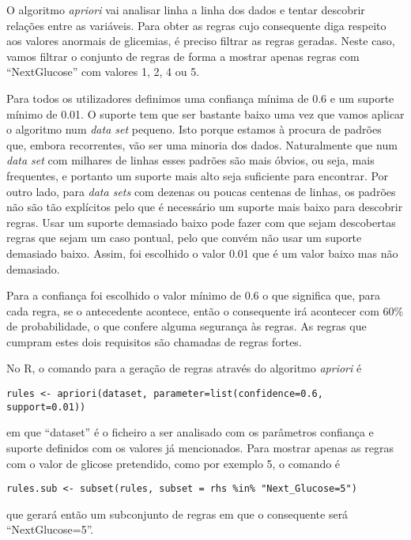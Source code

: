 O algoritmo \textit{apriori} vai analisar linha a linha dos dados e tentar descobrir relações entre as variáveis. Para obter as regras cujo consequente diga respeito aos valores anormais de glicemias, é preciso filtrar as regras geradas. Neste caso, vamos filtrar o conjunto de regras de forma a mostrar apenas regras com ``Next\textunderscore Glucose'' com valores 1, 2, 4 ou 5. 

Para todos os utilizadores definimos uma confiança mínima de 0.6 e um suporte mínimo de 0.01. O suporte tem que ser bastante baixo uma vez que vamos aplicar o algoritmo num \textit{data set} pequeno. Isto porque estamos à procura de padrões que, embora recorrentes, vão ser uma minoria dos dados. Naturalmente que num \textit{data set} com milhares de linhas esses padrões são mais óbvios, ou seja, mais frequentes, e portanto um suporte mais alto seja suficiente para encontrar. Por outro lado, para \textit{data sets} com dezenas ou poucas centenas de linhas, os padrões não são tão explícitos pelo que é necessário um suporte mais baixo para descobrir regras. Usar um suporte demasiado baixo pode fazer com que sejam descobertas regras que sejam um caso pontual, pelo que convém não usar um suporte demasiado baixo. Assim, foi escolhido o valor 0.01 que é um valor baixo mas não demasiado. 

Para a confiança foi escolhido o valor mínimo de 0.6 o que significa que, para cada regra, se o antecedente acontece, então o consequente irá acontecer com 60\% de probabilidade, o que confere alguma segurança às regras. As regras que cumpram estes dois requisitos são chamadas de regras fortes.


No R, o comando para a geração de regras através do algoritmo \textit{apriori} é

\begin{lstlisting}
rules <- apriori(dataset, parameter=list(confidence=0.6, support=0.01))
\end{lstlisting}

em que ``dataset'' é o ficheiro a ser analisado com os parâmetros confiança e suporte definidos com os valores já mencionados. Para mostrar apenas as regras com o valor de glicose pretendido, como por exemplo 5, o comando é

\begin{lstlisting}
rules.sub <- subset(rules, subset = rhs %in% "Next_Glucose=5")
\end{lstlisting}

que gerará então um subconjunto de regras em que o consequente será ``Next\textunderscore Glucose=5''.

